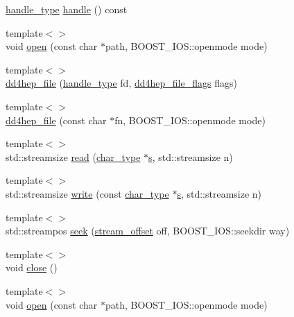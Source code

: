 \begin{DoxyCompactItemize}
\hyperlink{class_t}{handle\_\-type} \hyperlink{class_d_d4hep_1_1dd4hep__file_abad64676eda7a137560b48492beb8f24}{handle} () const 
\item 
{\footnotesize template$<$$>$ }\\void \hyperlink{class_d_d4hep_1_1dd4hep__file_ada7adfd16dc7cb56bd904f8ac6d84bfb}{open} (const char $\ast$path, BOOST\_\-IOS::openmode mode)
\item 
{\footnotesize template$<$$>$ }\\\hyperlink{class_d_d4hep_1_1dd4hep__file_ab9b135c2f27804dee1c5a23c321c9cf5}{dd4hep\_\-file} (\hyperlink{class_t}{handle\_\-type} fd, \hyperlink{namespace_d_d4hep_a31d19f9b0ce567067d2897fbda1761e5}{dd4hep\_\-file\_\-flags} flags)
\item 
{\footnotesize template$<$$>$ }\\\hyperlink{class_d_d4hep_1_1dd4hep__file_a303f6f139aa0876bbc6dc781715a95e2}{dd4hep\_\-file} (const char $\ast$fn, BOOST\_\-IOS::openmode mode)
\item 
{\footnotesize template$<$$>$ }\\std::streamsize \hyperlink{class_d_d4hep_1_1dd4hep__file_ad433ff99755cae5ecbab5be148948ce9}{read} (\hyperlink{class_d_d4hep_1_1dd4hep__file_aef4242f7f2fe15a59f7bf7a8f6ba24d5}{char\_\-type} $\ast$\hyperlink{_volumes_8cpp_a17ca6bfc8040d695d3cada22a4763d40}{s}, std::streamsize n)
\item 
{\footnotesize template$<$$>$ }\\std::streamsize \hyperlink{class_d_d4hep_1_1dd4hep__file_a0f35ab39573568a2ee21ea0bf8e837a1}{write} (const \hyperlink{class_d_d4hep_1_1dd4hep__file_aef4242f7f2fe15a59f7bf7a8f6ba24d5}{char\_\-type} $\ast$\hyperlink{_volumes_8cpp_a17ca6bfc8040d695d3cada22a4763d40}{s}, std::streamsize n)
\item 
{\footnotesize template$<$$>$ }\\std::streampos \hyperlink{class_d_d4hep_1_1dd4hep__file_a618d7b57c1fd892fa35ab82d1cf4cab5}{seek} (\hyperlink{class_d_d4hep_1_1dd4hep__file_a28e1531542193871075e8b7f47818113}{stream\_\-offset} off, BOOST\_\-IOS::seekdir way)
\item 
{\footnotesize template$<$$>$ }\\void \hyperlink{class_d_d4hep_1_1dd4hep__file_af2e625a13f1d378114bb18cd9724ad4e}{close} ()
\item 
{\footnotesize template$<$$>$ }\\void \hyperlink{class_d_d4hep_1_1dd4hep__file_a6f4deaa2542f09089611f0549a9a816d}{open} (const char $\ast$path, BOOST\_\-IOS::openmode mode)

\end{DoxyCompactItemize}

